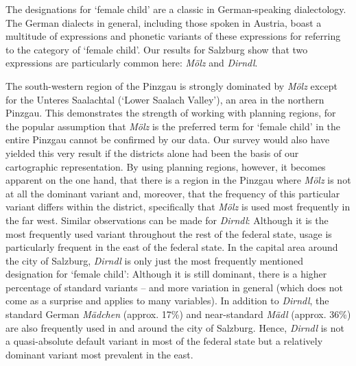 \documentclass[output=paper,colorlinks, citecolor=brown]{langscibook}
\begin{document}
The designations for `female child' are a classic in German{\hyp}speaking dialectology. The German dialects in general, including those spoken in Austria, boast a multitude of expressions and phonetic variants of these expressions for referring to the category of `female child'. Our results for Salzburg show that two expressions are particularly common here: \textit{Mölz} and \textit{Dirndl}.

The south-western region of the Pinzgau is strongly dominated by \textit{Mölz} except for the Unteres Saalachtal (‘Lower Saalach Valley’), an area in the northern Pinzgau. This demonstrates the strength of working with planning regions, for the popular assumption that \textit{Mölz} is the preferred term for `female child' in the entire Pinzgau cannot be confirmed by our data. Our survey would also have yielded this very result if the districts alone had been the basis of our cartographic representation. By using planning regions, however, it becomes apparent on the one hand, that there is a region in the Pinzgau where \textit{Mölz} is not at all the dominant variant and, moreover, that the frequency of this particular variant differs within the district, specifically that \textit{Mölz} is used most frequently in the far west. Similar observations can be made for \textit{Dirndl}: Although it is the most frequently used variant throughout the rest of the federal state, usage is particularly frequent in the east of the federal state. In the capital area around the city of Salzburg, \textit{Dirndl} is only just the most frequently mentioned designation for `female child': Although it is still dominant, there is a higher percentage of standard variants – and more variation in general (which does not come as a surprise and applies to many variables). In addition to \textit{Dirndl}, the standard German \textit{Mädchen} (approx. 17\%) and near-standard \textit{Mädl} (approx. 36\%) are also frequently used in and around the city of Salzburg. Hence, \textit{Dirndl} is not a quasi-absolute default variant in most of the federal state but a relatively dominant variant most prevalent in the east.
\end{document}
